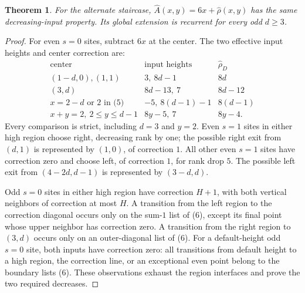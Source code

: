 \documentclass[11pt]{article}
\newtheorem{theorem}{Theorem}
\begin{document}
\begin{theorem}\label{thm:alternate}
For the alternate staircase, $\widehat A(x,y)=6x+\widehat\rho(x,y)$
has the same decreasing-input property. Its global extension is
recurrent for every odd $d\ge3$.
\end{theorem}
\begin{proof}
For even $s=0$ sites, subtract $6x$ at the center. The two effective
input heights and center correction are:
\[
\begin{array}{l|c|c}
\text{center}&\text{input heights}&\widehat\rho_D\\\hline
(1-d,0),(1,1)&3,\ 8d-1&8d\\
(3,d)&8d-13,\ 7&8d-12\\
x=2-d\text{ or }2\text{ in (5)}&-5,\ 8(d-1)-1&8(d-1)\\
x+y=2,\ 2\le y\le d-1&8y-5,\ 7&8y-4.
\end{array}                                                     \tag{8}
\]
Every comparison is strict, including $d=3$ and $y=2$.
Even $s=1$ sites in either high region choose right, decreasing rank
by one; the possible right exit from $(d,1)$ is represented by $(1,0)$,
of correction $1$. All other even $s=1$ sites have correction zero
and choose left, of correction $1$, for rank drop $5$. The possible
left exit from $(4-2d,d-1)$ is represented by $(3-d,d)$.

Odd $s=0$ sites in either high region have correction $H+1$, with
both vertical neighbors of correction at most $H$. A transition from
the left region to the correction diagonal occurs only on the sum-$1$
list of (6), except its final point whose upper neighbor has correction
zero. A transition from the right region to $(3,d)$ occurs only on
an outer-diagonal list of (6). For a default-height odd $s=0$ site,
both inputs have correction zero: all transitions from default height
to a high region, the correction line, or an exceptional even point
belong to the boundary lists (6). These observations exhaust the
region interfaces and prove the two required decreases.


\end{proof}
\end{document}
